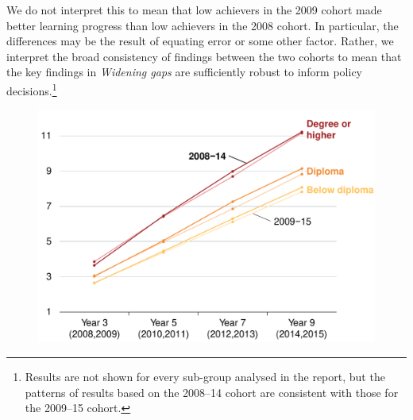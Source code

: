 We do not interpret this to mean that low achievers in the 2009 cohort made better learning progress than low achievers in the 2008 cohort. In particular, the differences may be the result of equating error or some other factor. Rather, we interpret the broad consistency of findings between the two cohorts to mean that the key findings in \textit{Widening gaps} are sufficiently robust to inform policy decisions.\footnote{Results are not shown for every sub-group analysed in the report, but the patterns of results based on the 2008--14 cohort are consistent with those for the 2009--15 cohort.}

\begin{figure}[H]
 \includegraphics[width=\columnwidth]{atlas/par_ed_08.pdf}\label{fig:par_ed_08}

\end{figure}

